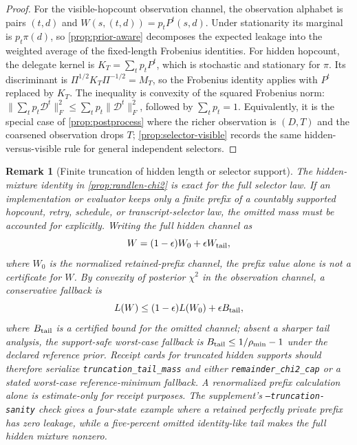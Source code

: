 \documentclass[11pt]{article}
\newtheorem{remark}[theorem]{Remark}
\newcommand{\cD}{\mathcal{D}}
\newcommand{\PiM}{\Pi}
\begin{document}
\begin{proof}
For the visible-hopcount observation channel, the observation alphabet is pairs
$(t,d)$ and $W(s,(t,d))=p_tP^t(s,d)$.  Under stationarity its marginal is
$p_t\pi(d)$, so \cref{prop:prior-aware} decomposes the expected leakage into the
weighted average of the fixed-length Frobenius identities.  For hidden hopcount,
the delegate kernel is $K_T=\sum_t p_tP^t$, which is stochastic and stationary for
$\pi$.  Its discriminant is $\PiM^{1/2}K_T\PiM^{-1/2}=M_T$, so the Frobenius
identity applies with $P^t$ replaced by $K_T$.  The inequality is convexity of the
squared Frobenius norm:
$\|\sum_t p_t\cD^t\|_F^2\le\sum_t p_t\|\cD^t\|_F^2$, followed by
$\sum_t p_t=1$.  Equivalently, it is the special case of
\cref{prop:postprocess} where the richer observation is $(D,T)$ and the
coarsened observation drops $T$; \cref{prop:selector-visible} records the same
hidden-versus-visible rule for general independent selectors.

\end{proof}

\begin{remark}[Finite truncation of hidden length or selector support]\label{rem:truncation-tail}
The hidden-mixture identity in \cref{prop:randlen-chi2} is exact for the full
selector law. If an implementation or evaluator keeps only a finite prefix of a
countably supported hopcount, retry, schedule, or transcript-selector law, the
omitted mass must be accounted for explicitly. Writing the full hidden channel as
\[
  W=(1-\epsilon)W_0+\epsilon W_{\rm tail},
\]
where $W_0$ is the normalized retained-prefix channel, the prefix value alone is
not a certificate for $W$. By convexity of posterior $\chi^2$ in the observation
channel, a conservative fallback is
\[
  L(W) \le (1-\epsilon)L(W_0)+\epsilon B_{\rm tail},
\]
where $B_{\rm tail}$ is a certified bound for the omitted channel; absent a
sharper tail analysis, the support-safe worst-case fallback is
$B_{\rm tail}\le 1/\rho_{\min}-1$ under the declared reference prior. Receipt
cards for truncated hidden supports should therefore serialize
\nolinkurl{truncation_tail_mass} and either \nolinkurl{remainder_chi2_cap} or a
stated worst-case reference-minimum fallback. A renormalized prefix calculation
alone is estimate-only for receipt purposes. The supplement's
\texttt{--truncation-sanity} check gives a four-state example where a retained
perfectly private prefix has zero leakage, while a five-percent omitted
identity-like tail makes the full hidden mixture nonzero.
\end{remark}
\end{document}
